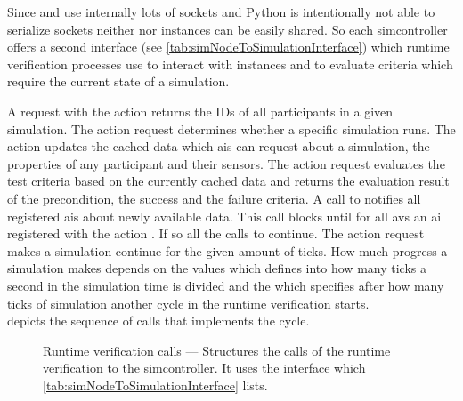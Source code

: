 Since \beamng{} and \beamngpy{} use internally lots of sockets and Python is intentionally not able to serialize sockets neither \beamng{} nor \beamngpy{} instances can be easily shared.
So each \gls{simcontroller} offers a second interface (see \cref{tab:simNodeToSimulationInterface}) which runtime verification processes use to interact with \beamng{} instances and to evaluate criteria which require the current state of a simulation.
\begin{table}
    \centering
    \caption{%
        Interface to runtime verification processes --- Describes the interface that a runtime verification uses to interact with simulations using action requests.
         describes the structure of action requests.
    }\label{tab:simNodeToSimulationInterface}
    \medskip
    
\end{table}
A request with the action  returns the IDs of all participants in a given simulation.
The action request  determines whether a specific simulation runs.
The action  updates the cached data which \glspl{ai} can request about a simulation, the properties of any participant and their sensors.
The action request  evaluates the test criteria based on the currently cached data and returns the evaluation result of the precondition, the success and the failure criteria.
A call to  notifies all registered \glspl{ai} about newly available data.
This call blocks until for all \glspl{av} an \gls{ai} registered with the action .
If so all the calls to  continue.
The action request  makes a simulation continue for the given amount of ticks.
How much progress a simulation makes depends on the values  which defines into how many ticks a second in the simulation time is divided and the  which specifies after how many ticks of simulation another cycle in the runtime verification starts.\\
 depicts the sequence of calls that implements the cycle.
\begin{figure}
    \centering
    
    \medskip
    \caption{%
        Runtime verification calls --- Structures the calls of the runtime verification to the \gls{simcontroller}.
        It uses the interface which \cref{tab:simNodeToSimulationInterface} lists.
    }\label{fig:runtimeVerificationScheme}
\end{figure}
